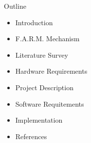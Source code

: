 \documentclass[10pt]{beamer}
\begin{document}


\begin{frame}[t]{Outline}\label{s2}
\begin{itemize}
	\item{Introduction }
	\item{ F.A.R.M. Mechanism}
	\item{Literature Survey}
	\item{Hardware Requirements}
	\item{Project Description }
	\item{Software Requitements}
	\item{Implementation}
	\item{References}

\end{itemize}
\end{frame}
%
%
%
%
%
%
%
\end{document}
